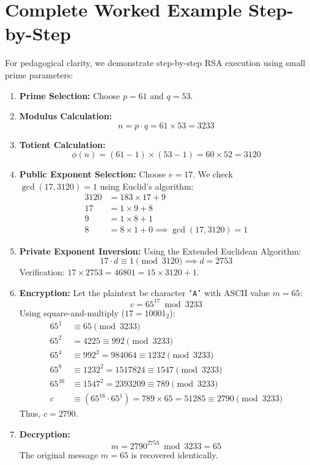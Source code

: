 \section{Complete Worked Example Step-by-Step}
For pedagogical clarity, we demonstrate step-by-step RSA execution using small prime parameters:
\begin{enumerate}
    \item \textbf{Prime Selection:} Choose $p = 61$ and $q = 53$.
    \item \textbf{Modulus Calculation:}
    \begin{equation}
    n = p \cdot q = 61 \times 53 = 3233
    \end{equation}
    \item \textbf{Totient Calculation:}
    \begin{equation}
    \phi(n) = (61 - 1) \times (53 - 1) = 60 \times 52 = 3120
    \end{equation}
    \item \textbf{Public Exponent Selection:} Choose $e = 17$. We check $\gcd(17, 3120) = 1$ using Euclid's algorithm:
    \begin{align*}
    3120 &= 183 \times 17 + 9 \\
    17 &= 1 \times 9 + 8 \\
    9 &= 1 \times 8 + 1 \\
    8 &= 8 \times 1 + 0 \implies \gcd(17, 3120) = 1
    \end{align*}
    \item \textbf{Private Exponent Inversion:} Using the Extended Euclidean Algorithm:
    \begin{equation}
    17 \cdot d \equiv 1 \pmod{3120} \implies d = 2753
    \end{equation}
    Verification: $17 \times 2753 = 46801 = 15 \times 3120 + 1$.
    \item \textbf{Encryption:} Let the plaintext be character \texttt{'A'} with ASCII value $m = 65$:
    \begin{equation}
    c = 65^{17} \bmod 3233
    \end{equation}
    Using square-and-multiply ($17 = 10001_2$):
    \begin{align*}
    65^1 &\equiv 65 \pmod{3233} \\
    65^2 &= 4225 \equiv 992 \pmod{3233} \\
    65^4 &\equiv 992^2 = 984064 \equiv 1232 \pmod{3233} \\
    65^8 &\equiv 1232^2 = 1517824 \equiv 1547 \pmod{3233} \\
    65^{16} &\equiv 1547^2 = 2393209 \equiv 789 \pmod{3233} \\
    c &\equiv (65^{16} \cdot 65^1) = 789 \times 65 = 51285 \equiv 2790 \pmod{3233}
    \end{align*}
    Thus, $c = 2790$.
    \item \textbf{Decryption:}
    \begin{equation}
    m = 2790^{2753} \bmod 3233 = 65
    \end{equation}
    The original message $m = 65$ is recovered identically.
\end{enumerate}

